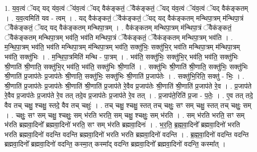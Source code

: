 \documentclass[17pt]{extarticle}
\begin{document}
1. य॒व॒त्वं ॅयद् यद् य॑व॒त्वं ॅय॑व॒त्वं ॅयद् वैक॑ङ्कतं॒ ॅवैक॑ङ्कतं॒ ॅयद् य॑व॒त्वं ॅय॑व॒त्वं ॅयद् वैक॑ङ्कतम् । . य॒व॒त्वमिति॑ यव - त्वम् । . यद् वैक॑ङ्कतं॒ ॅवैक॑ङ्कतं॒ ॅयद् यद् वैक॑ङ्कतम् मन्थिपा॒त्रम् म॑न्थिपा॒त्रं ॅवैक॑ङ्कतं॒ ॅयद् यद् वैक॑ङ्कतम् मन्थिपा॒त्रम् । . वैक॑ङ्कतम् मन्थिपा॒त्रम् म॑न्थिपा॒त्रं ॅवैक॑ङ्कतं॒ ॅवैक॑ङ्कतम् मन्थिपा॒त्रम् भव॑ति॒ भव॑ति मन्थिपा॒त्रं ॅवैक॑ङ्कतं॒ ॅवैक॑ङ्कतम् मन्थिपा॒त्रम् भव॑ति । . म॒न्थि॒पा॒त्रम् भव॑ति॒ भव॑ति मन्थिपा॒त्रम् म॑न्थिपा॒त्रम् भव॑ति॒ सक्तु॑भिः॒ सक्तु॑भि॒र् भव॑ति मन्थिपा॒त्रम् म॑न्थिपा॒त्रम् भव॑ति॒ सक्तु॑भिः । . म॒न्थि॒पा॒त्रमिति॑ मन्थि - पा॒त्रम् । . भव॑ति॒ सक्तु॑भिः॒ सक्तु॑भि॒र् भव॑ति॒ भव॑ति॒ सक्तु॑भिः श्री॒णाति॑ श्री॒णाति॒ सक्तु॑भि॒र् भव॑ति॒ भव॑ति॒ सक्तु॑भिः श्री॒णाति॑ । . सक्तु॑भिः श्री॒णाति॑ श्री॒णाति॒ सक्तु॑भिः॒ सक्तु॑भिः श्री॒णाति॑ प्र॒जाप॑तेः प्र॒जाप॑तेः श्री॒णाति॒ सक्तु॑भिः॒ सक्तु॑भिः श्री॒णाति॑ प्र॒जाप॑तेः । . सक्तु॑भि॒रिति॒ सक्तु॑ - भिः॒ । . श्री॒णाति॑ प्र॒जाप॑तेः प्र॒जाप॑तेः श्री॒णाति॑ श्री॒णाति॑ प्र॒जाप॑ते रे॒वैव प्र॒जाप॑तेः श्री॒णाति॑ श्री॒णाति॑ प्र॒जाप॑ते रे॒व । . प्र॒जाप॑ते रे॒वैव प्र॒जाप॑तेः प्र॒जाप॑ते रे॒व तत् तदे॒व प्र॒जाप॑तेः प्र॒जाप॑ते रे॒व तत् । . प्र॒जाप॑ते॒रिति॑ प्र॒जा - प॒तेः॒ । . ए॒व तत् तदे॒ वैव तच् चक्षु॒ श्चक्षु॒ स्तदे॒ वैव तच् चक्षुः॑ । . तच् चक्षु॒ श्चक्षु॒ स्तत् तच् चक्षुः॒ सꣳ सम् चक्षु॒ स्तत् तच् चक्षुः॒ सम् । . चक्षुः॒ सꣳ सम् चक्षु॒ श्चक्षुः॒ सम् भ॑रति भरति॒ सम् चक्षु॒ श्चक्षुः॒ सम् भ॑रति । . सम् भ॑रति भरति॒ सꣳ सम् भ॑रति ब्रह्मवा॒दिनो᳚ ब्रह्मवा॒दिनो॑ भरति॒ सꣳ सम् भ॑रति ब्रह्मवा॒दिनः॑ । . भ॒र॒ति॒ ब्र॒ह्म॒वा॒दिनो᳚ ब्रह्मवा॒दिनो॑ भरति भरति ब्रह्मवा॒दिनो॑ वदन्ति वदन्ति ब्रह्मवा॒दिनो॑ भरति भरति ब्रह्मवा॒दिनो॑ वदन्ति । . ब्र॒ह्म॒वा॒दिनो॑ वदन्ति वदन्ति ब्रह्मवा॒दिनो᳚ ब्रह्मवा॒दिनो॑ वदन्ति॒ कस्मा॒त् कस्मा᳚द् वदन्ति ब्रह्मवा॒दिनो᳚ ब्रह्मवा॒दिनो॑ वदन्ति॒ कस्मा᳚त् । \newline
\end{document}
